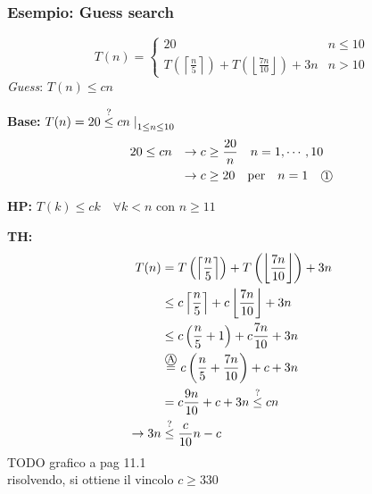 \subsubsection{Esempio: Guess search}
\[
    T(n) = 
    \begin{cases} 
        20      &  n \leq 10 \\
        T \left( \left\lceil \frac{n}{5} \right\rceil \right) + 
        T \left( \left\lfloor \frac{7n}{10} \right\rfloor \right) + 3n & n > 10
    \end{cases}
\]
\textit{Guess}: $T(n) \leq cn$
\begin{description}
    \item{\textbf{Base:}}
        $ T(n) = 20 \overset{?}{\leq} cn \left. \right|_{1 \leq n \leq 10} $
        \begin{align*}
            20& \leq cn& \rightarrow c& \geq \frac{20}{n} \quad n=1,\cdots,10 \\
              &        & \rightarrow c& \geq 20 \quad \text{per} \quad n=1 \quad \mbox{\textcircled{\footnotesize 1}} 
        \end{align*}
    \item{\textbf{HP:}} $T(k) \leq ck \quad \forall k<n $ con $ n \geq 11 $
    \item{\textbf{TH:}} 
        \begin{equation*}
            \begin{split}
                T(n) &=
                T \left( \left\lceil \frac{n}{5} \right\rceil \right) + 
                T \left( \left\lfloor \frac{7n}{10} \right\rfloor \right) + 3n \\
                &\leq c \left\lceil \frac{n}{5} \right\rceil  + 
                c \left\lfloor \frac{7n}{10} \right\rfloor  + 3n \\
                & \leq c \left( \frac{n}{5}+1 \right) + c \frac{7n}{10} + 3n \\
                & \overset{\mbox{\textcircled{\footnotesize A}}}{=} c \left( \frac{n}{5} + \frac{7n}{10} \right) + c + 3n \\
                &= c \frac{9n}{10} + c + 3n \overset{?}{\leq} cn\\
                \rightarrow 3n & \overset{?}{\leq} \frac{c}{10}n -c \\
            \end{split}
        \end{equation*}
        TODO grafico a pag 11.1\\
        risolvendo, si ottiene il vincolo $c \geq 330$ \\

\end{description}
